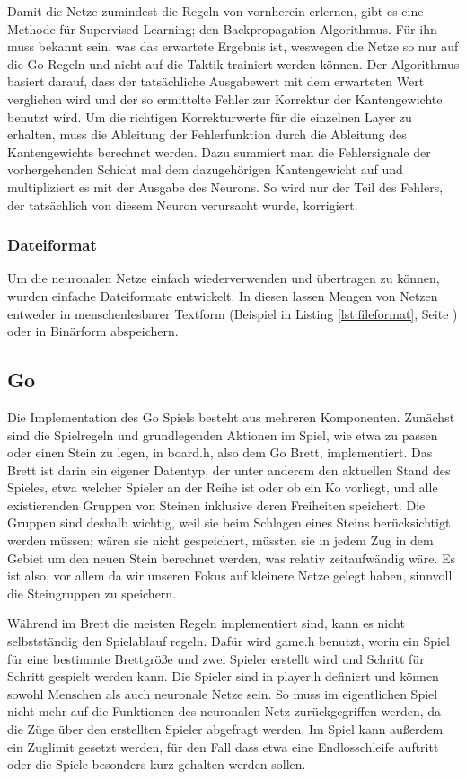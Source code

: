 Damit die Netze zumindest die Regeln von vornherein erlernen, gibt es eine
Methode für Supervised Learning; den Backpropagation
Algorithmus. Für ihn muss bekannt sein, was das erwartete Ergebnis ist, weswegen
die Netze so nur auf die Go Regeln und nicht auf die Taktik trainiert werden
können. Der Algorithmus basiert darauf, dass der tatsächliche Ausgabewert mit
dem erwarteten Wert verglichen wird und der so ermittelte Fehler zur Korrektur
der Kantengewichte benutzt wird. Um die richtigen Korrekturwerte für die
einzelnen Layer zu erhalten, muss die Ableitung der Fehlerfunktion durch die
Ableitung des Kantengewichts berechnet werden. Dazu summiert man die
Fehlersignale der vorhergehenden Schicht mal dem dazugehörigen Kantengewicht auf
und multipliziert es mit der Ausgabe des Neurons. So wird nur der Teil des
Fehlers, der tatsächlich von diesem Neuron verursacht wurde, korrigiert. 

\subsubsection{Dateiformat}
Um die neuronalen Netze einfach wiederverwenden und übertragen zu können,
wurden einfache Dateiformate entwickelt. In diesen lassen Mengen von Netzen
entweder in menschenlesbarer Textform (Beispiel in Listing
\ref{lst:fileformat}, Seite \pageref{lst:fileformat}) oder in Binärform
abspeichern.

\subsection{Go}

Die Implementation des Go Spiels besteht aus mehreren Komponenten. Zunächst sind
die Spielregeln und grundlegenden Aktionen im Spiel, wie etwa zu passen oder
einen Stein zu legen, in board.h, also dem Go Brett, implementiert. Das Brett
ist darin ein eigener Datentyp, der unter anderem den aktuellen Stand des
Spieles, etwa welcher Spieler an der Reihe ist oder ob ein Ko vorliegt, und alle
existierenden Gruppen von Steinen inklusive deren Freiheiten speichert. Die
Gruppen sind deshalb wichtig, weil sie beim Schlagen eines Steins berücksichtigt
werden müssen; wären sie nicht gespeichert, müssten sie in jedem Zug in dem
Gebiet um den neuen Stein berechnet werden, was relativ zeitaufwändig wäre. Es
ist also, vor allem da wir unseren Fokus auf kleinere Netze gelegt haben,
sinnvoll die Steingruppen zu speichern. 

Während im Brett die meisten Regeln implementiert sind, kann es nicht
selbstständig den Spielablauf regeln. Dafür wird game.h benutzt, worin ein Spiel
für eine bestimmte Brettgröße und zwei Spieler erstellt wird und Schritt für
Schritt gespielt werden kann. Die Spieler sind in player.h definiert und können
sowohl Menschen als auch neuronale Netze sein. So muss im eigentlichen Spiel
nicht mehr auf die Funktionen des neuronalen Netz zurückgegriffen werden, da die
Züge über den erstellten Spieler abgefragt werden. Im Spiel kann außerdem ein
Zuglimit gesetzt werden, für den Fall dass etwa eine Endlosschleife auftritt
oder die Spiele besonders kurz gehalten werden sollen. 

